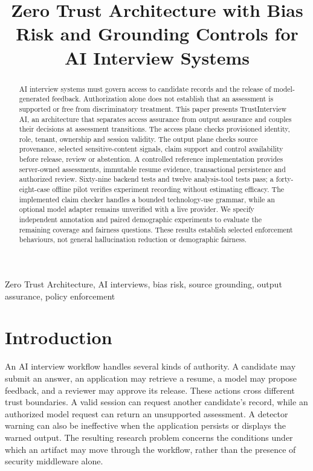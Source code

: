 \documentclass[conference]{IEEEtran}
\begin{document}
\title{Zero Trust Architecture with Bias Risk and Grounding Controls for AI Interview Systems}
\author{
}
\maketitle

\begin{abstract}
AI interview systems must govern access to candidate records and the release of model-generated feedback. Authorization alone does not establish that an assessment is supported or free from discriminatory treatment. This paper presents TrustInterview AI, an architecture that separates access assurance from output assurance and couples their decisions at assessment transitions. The access plane checks provisioned identity, role, tenant, ownership and session validity. The output plane checks source provenance, selected sensitive-content signals, claim support and control availability before release, review or abstention. A controlled reference implementation provides server-owned assessments, immutable resume evidence, transactional persistence and authorized review. Sixty-nine backend tests and twelve analysis-tool tests pass; a forty-eight-case offline pilot verifies experiment recording without estimating efficacy. The implemented claim checker handles a bounded technology-use grammar, while an optional model adapter remains unverified with a live provider. We specify independent annotation and paired demographic experiments to evaluate the remaining coverage and fairness questions. These results establish selected enforcement behaviours, not general hallucination reduction or demographic fairness.
\end{abstract}
\begin{IEEEkeywords}
Zero Trust Architecture, AI interviews, bias risk, source grounding, output assurance, policy enforcement
\end{IEEEkeywords}

\section{Introduction}
An AI interview workflow handles several kinds of authority. A candidate may submit an answer, an application may retrieve a resume, a model may propose feedback, and a reviewer may approve its release. These actions cross different trust boundaries. A valid session can request another candidate's record, while an authorized model request can return an unsupported assessment. A detector warning can also be ineffective when the application persists or displays the warned output. The resulting research problem concerns the conditions under which an artifact may move through the workflow, rather than the presence of security middleware alone.
\end{document}
